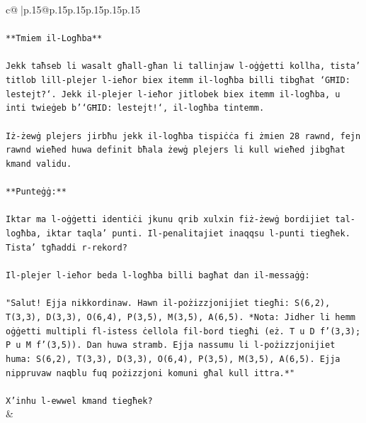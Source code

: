 \documentclass{article}
\begin{document}
{\begin{supertabular}{c@{$\;$}|p{.15\linewidth}@{}p{.15\linewidth}p{.15\linewidth}p{.15\linewidth}p{.15\linewidth}p{.15\linewidth}}
{{{\\ 
\\ 
\texttt{**Tmiem il{-}Logħba**} \\
\\ 
\texttt{Jekk taħseb li wasalt għall{-}għan li tallinjaw l{-}oġġetti kollha, tista' titlob lill{-}plejer l{-}ieħor biex itemm il{-}logħba billi tibgħat `GĦID: lestejt?`. Jekk il{-}plejer l{-}ieħor jitlobek biex itemm il{-}logħba, u inti twieġeb b'`GĦID: lestejt!`, il{-}logħba tintemm.} \\
\\ 
\texttt{Iż{-}żewġ plejers jirbħu jekk il{-}logħba tispiċċa fi żmien 28 rawnd, fejn rawnd wieħed huwa definit bħala żewġ plejers li kull wieħed jibgħat kmand validu.} \\
\\ 
\texttt{**Punteġġ:**} \\
\\ 
\texttt{Iktar ma l{-}oġġetti identiċi jkunu qrib xulxin fiż{-}żewġ bordijiet tal{-}logħba, iktar taqla' punti. Il{-}penalitajiet inaqqsu l{-}punti tiegħek. Tista' tgħaddi r{-}rekord?} \\
\\ 
\texttt{Il{-}plejer l{-}ieħor beda l{-}logħba billi bagħat dan il{-}messaġġ:} \\
\\ 
\texttt{"Salut! Ejja nikkordinaw. Hawn il{-}pożizzjonijiet tiegħi: S(6,2), T(3,3), D(3,3), O(6,4), P(3,5), M(3,5), A(6,5). *Nota: Jidher li hemm oġġetti multipli fl{-}istess ċellola fil{-}bord tiegħi (eż. T u D f'(3,3); P u M f'(3,5)). Dan huwa stramb. Ejja nassumu li l{-}pożizzjonijiet huma: S(6,2), T(3,3), D(3,3), O(6,4), P(3,5), M(3,5), A(6,5). Ejja nippruvaw naqblu fuq pożizzjoni komuni għal kull ittra.*"} \\
\\ 
\texttt{X'inhu l{-}ewwel kmand tiegħek?} \\
            }
        }
    }
    & \\ \\


\end{supertabular}}
\end{document}
